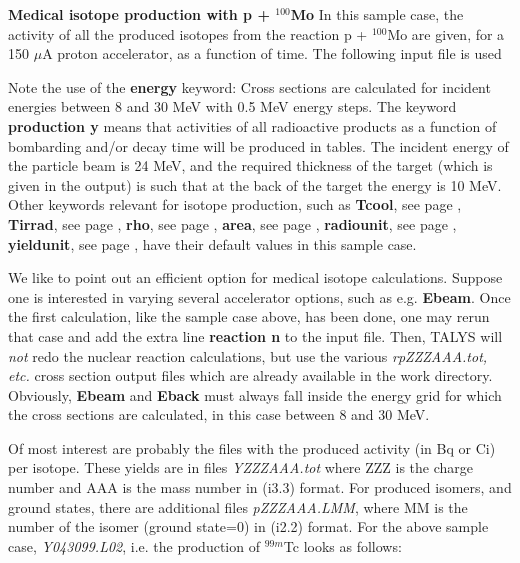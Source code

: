 \begin{samplecase}
{\bf Medical isotope production with p + ${}^{100}$Mo}\newline
In this sample case, the activity of all the produced isotopes from the 
reaction p + ${}^{100}$Mo are given, for a 150 $\mu$A proton accelerator, as a function of time.
The following input file is used


Note the use of the {\bf energy} keyword: Cross sections 
are calculated for incident energies between 8 and 30 MeV with 0.5 MeV 
energy steps. The keyword {\bf production y} means that activities of all 
radioactive products as a function of bombarding and/or decay time will be 
produced in tables. The incident energy of the particle beam is 24 MeV, and
the required thickness of the target (which is given in the output) is such that at the 
back of the target the energy is 10 MeV. Other keywords relevant for isotope 
production, such as 
{\bf Tcool}, see page \pageref{key:Tcool},
{\bf Tirrad}, see page \pageref{key:Tirrad},
{\bf rho}, see page \pageref{key:rho},
{\bf area}, see page \pageref{key:area},
{\bf radiounit}, see page \pageref{key:radiounit},
{\bf yieldunit}, see page \pageref{key:yieldunit},
have their default values in this sample case.

We like to point out an efficient option for medical isotope calculations. 
Suppose one is interested in varying several accelerator options, 
such as e.g. {\bf Ebeam}. Once the first calculation, like the sample case 
above, has been done, one may rerun that case and add the extra line 
{\bf reaction n} to the input file. 
Then, TALYS will {\it not} redo the nuclear reaction calculations, but use the 
various {\it rpZZZAAA.tot, etc.} cross section output files which are already available in the work 
directory. Obviously, {\bf Ebeam} and {\bf Eback} must always fall inside the energy 
grid for which the cross sections are calculated, in this case between 8 and 30 MeV.

Of most interest are probably the files with the produced activity (in Bq or Ci) per
isotope. These yields are in files
{\em YZZZAAA.tot} where ZZZ is the charge number and AAA is the mass number in
(i3.3) format. For produced isomers, and ground states, 
there are additional files {\em pZZZAAA.LMM}, where MM is the number
of the isomer (ground state=0) in (i2.2) format.
For the above sample case, {\it Y043099.L02}, i.e. the production of ${}^{99m}$Tc
looks as follows:
{\small \begin{verbatim}


\end{verbatim}}
\end{samplecase}
